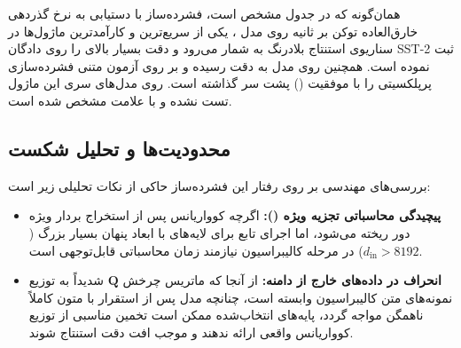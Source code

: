 همان‌گونه که در جدول مشخص است، فشرده‌ساز  با دستیابی به نرخ گذردهی خارق‌العاده  توکن بر ثانیه روی مدل ، یکی از سریع‌ترین و کارآمدترین ماژول‌ها در سناریوی استنتاج بلادرنگ به شمار می‌رود و دقت بسیار بالای  را روی دادگان SST-2 ثبت نموده است. همچنین روی مدل  به دقت  رسیده و بر روی  آزمون متنی فشرده‌سازی پرپلکسیتی را با موفقیت () پشت سر گذاشته است. روی مدل‌های سری  این ماژول تست نشده و با علامت  مشخص شده است.

\subsection{محدودیت‌ها و تحلیل شکست}
بررسی‌های مهندسی بر روی رفتار این فشرده‌ساز حاکی از نکات تحلیلی زیر است:
\begin{itemize}
    \item \textbf{پیچیدگی محاسباتی تجزیه ویژه ():} اگرچه کوواریانس پس از استخراج بردار ویژه دور ریخته می‌شود، اما اجرای تابع  برای لایه‌های با ابعاد پنهان بسیار بزرگ ($d_{\text{in}} > 8192$) در مرحله کالیبراسیون نیازمند زمان محاسباتی قابل‌توجهی است.
    \item \textbf{انحراف در داده‌های خارج از دامنه:} از آنجا که ماتریس چرخش $\mathbf{Q}$ شدیداً به توزیع نمونه‌های متن کالیبراسیون وابسته است، چنانچه مدل پس از استقرار با متون کاملاً ناهمگن مواجه گردد، پایه‌های انتخاب‌شده ممکن است تخمین مناسبی از توزیع کوواریانس واقعی ارائه ندهند و موجب افت دقت استنتاج شوند.
\end{itemize}
